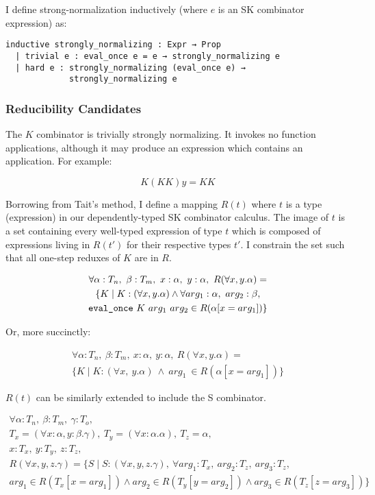 \documentclass[11pt]{article}
\begin{document}
I define strong-normalization inductively (where \(e\) is an SK combinator expression) as:

\begin{verbatim}
inductive strongly_normalizing : Expr → Prop
  | trivial e : eval_once e = e → strongly_normalizing e
  | hard e : strongly_normalizing (eval_once e) →
             strongly_normalizing e
\end{verbatim}
\subsubsection{Reducibility Candidates}
\label{sec:orgf34f08f}

The \(K\) combinator is trivially strongly normalizing. It invokes no function applications, although it may produce an expression which contains an application. For example:

\[
K (KK) y = KK
\]

Borrowing from Tait's method, I define a mapping \(R(t)\) where \(t\) is a type (expression) in our dependently-typed SK combinator calculus. The image of \(t\) is a set containing every well-typed expression of type \(t\) which is composed of expressions living in \(R(t')\) for their respective types \(t'\). I constrain the set such that all one-step reduxes of \(K\) are in \(R\).

\begin{gather*}
\forall \alpha : T_{n},\ \beta : T_{m},\ x : \alpha,\ y : \alpha,\ R(\forall x, y.\alpha) = \\
\{ K \mid  K : (\forall x, y.\alpha) \land \forall arg_{1} : \alpha,\ arg_{2} : \beta, \\
\text{\texttt{eval\_once}}\ K\  arg_{1}\  arg_{2} \in R(\alpha[x = arg_{1}]) \}
\end{gather*}

Or, more succinctly:

\begin{gather*}
\forall \alpha : T_{n},\ \beta : T_{m},\ x : \alpha,\ y : \alpha,\ R(\forall x, y.\alpha) = \\
\{ K \mid K : (\forall x,\ y.\alpha)\ \land\  arg_{1}\ \in R(\alpha[x = arg_{1}]) \}
\end{gather*}

\(R(t)\) can be similarly extended to include the S combinator.

\begin{gather*}
\forall \alpha : T_{n},\ \beta : T_{m},\ \gamma : T_{o},\ \\
T_{x} = (\forall x : \alpha, y : \beta.\gamma),\ T_{y} = (\forall x : \alpha.\alpha),\ T_{z} = \alpha,\ \\
x : T_{x},\ y : T_{y},\ z : T_{z}, \\
R(\forall x, y, z.\gamma) = \{ S \mid
  S : (\forall x, y, z.\gamma),\ \forall arg_{1} : T_{x},\ arg_{2} : T_{z},\ arg_{3} : T_{z}, \\
  arg_{1} \in R(T_{x}[x = arg_{1}]) \land arg_{2} \in R(T_{y}[y = arg_{2}]) \land arg_{3} \in R(T_{z}[z = arg_{3}]) \}
\end{gather*}
\end{document}
